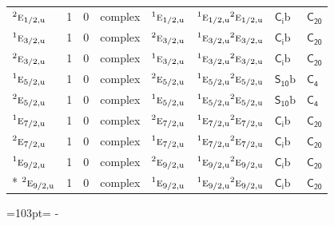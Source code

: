 \documentclass[10pt,a4paper]{article}
\newcommand{\needspace}[1]{\par\penalty-100\begingroup\dimen0=#1\relax\dimen2=\pagegoal
  \advance\dimen2-\pagetotal\ifdim\dimen0>\dimen2\relax\ifdim\dimen2>0pt\vfil\break\fi\fi
  \endgroup}
\numberwithin{equation}{section}
\newcommand{\grp}[1]{\mathsf{#1}}
\newcommand{\irr}[1]{\text{\normalfont\scshape #1}}
\newcommand{\conjpair}[1]{{}^{#1}}
\newcommand{\ptag}[1]{\mathrm{#1}}
\newcommand{\secondclass}{\mathrm{b}}
\begin{document}
{\begin{longtable}{@{}lrrlllll@{}}
$\conjpair{2}\irr{e}_{1/2,\ptag{u}}$ & 1 & $0$ & complex & $\conjpair{1}\irr{e}_{1/2,\ptag{u}}$ & $\conjpair{1}\irr{e}_{1/2,\ptag{u}}\conjpair{2}\irr{e}_{1/2,\ptag{u}}$ & \href{S2b.pdf}{$\grp{C_{i}}\secondclass$} & $\grp{C_{20}}$\\
$\conjpair{1}\irr{e}_{3/2,\ptag{u}}$ & 1 & $0$ & complex & $\conjpair{2}\irr{e}_{3/2,\ptag{u}}$ & $\conjpair{1}\irr{e}_{3/2,\ptag{u}}\conjpair{2}\irr{e}_{3/2,\ptag{u}}$ & \href{S2b.pdf}{$\grp{C_{i}}\secondclass$} & $\grp{C_{20}}$\\
$\conjpair{2}\irr{e}_{3/2,\ptag{u}}$ & 1 & $0$ & complex & $\conjpair{1}\irr{e}_{3/2,\ptag{u}}$ & $\conjpair{1}\irr{e}_{3/2,\ptag{u}}\conjpair{2}\irr{e}_{3/2,\ptag{u}}$ & \href{S2b.pdf}{$\grp{C_{i}}\secondclass$} & $\grp{C_{20}}$\\
$\conjpair{1}\irr{e}_{5/2,\ptag{u}}$ & 1 & $0$ & complex & $\conjpair{2}\irr{e}_{5/2,\ptag{u}}$ & $\conjpair{1}\irr{e}_{5/2,\ptag{u}}\conjpair{2}\irr{e}_{5/2,\ptag{u}}$ & \href{S10b.pdf}{$\grp{S_{10}}\secondclass$} & \href{../../../rotation/data/pdf/C4.pdf}{$\grp{C_{4}}$}\\
$\conjpair{2}\irr{e}_{5/2,\ptag{u}}$ & 1 & $0$ & complex & $\conjpair{1}\irr{e}_{5/2,\ptag{u}}$ & $\conjpair{1}\irr{e}_{5/2,\ptag{u}}\conjpair{2}\irr{e}_{5/2,\ptag{u}}$ & \href{S10b.pdf}{$\grp{S_{10}}\secondclass$} & \href{../../../rotation/data/pdf/C4.pdf}{$\grp{C_{4}}$}\\
$\conjpair{1}\irr{e}_{7/2,\ptag{u}}$ & 1 & $0$ & complex & $\conjpair{2}\irr{e}_{7/2,\ptag{u}}$ & $\conjpair{1}\irr{e}_{7/2,\ptag{u}}\conjpair{2}\irr{e}_{7/2,\ptag{u}}$ & \href{S2b.pdf}{$\grp{C_{i}}\secondclass$} & $\grp{C_{20}}$\\
$\conjpair{2}\irr{e}_{7/2,\ptag{u}}$ & 1 & $0$ & complex & $\conjpair{1}\irr{e}_{7/2,\ptag{u}}$ & $\conjpair{1}\irr{e}_{7/2,\ptag{u}}\conjpair{2}\irr{e}_{7/2,\ptag{u}}$ & \href{S2b.pdf}{$\grp{C_{i}}\secondclass$} & $\grp{C_{20}}$\\
$\conjpair{1}\irr{e}_{9/2,\ptag{u}}$ & 1 & $0$ & complex & $\conjpair{2}\irr{e}_{9/2,\ptag{u}}$ & $\conjpair{1}\irr{e}_{9/2,\ptag{u}}\conjpair{2}\irr{e}_{9/2,\ptag{u}}$ & \href{S2b.pdf}{$\grp{C_{i}}\secondclass$} & $\grp{C_{20}}$\\*
$\conjpair{2}\irr{e}_{9/2,\ptag{u}}$ & 1 & $0$ & complex & $\conjpair{1}\irr{e}_{9/2,\ptag{u}}$ & $\conjpair{1}\irr{e}_{9/2,\ptag{u}}\conjpair{2}\irr{e}_{9/2,\ptag{u}}$ & \href{S2b.pdf}{$\grp{C_{i}}\secondclass$} & $\grp{C_{20}}$\\
\bottomrule\end{longtable}}
\needspace{103pt}
\end{document}
